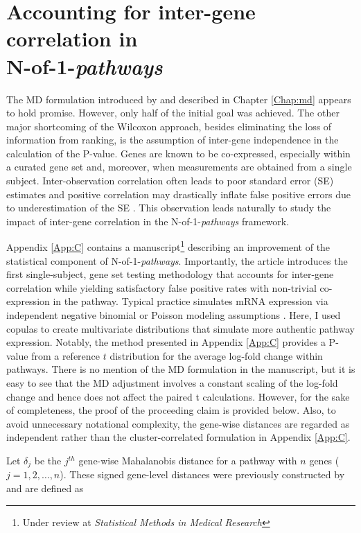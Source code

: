 \chapter{Accounting for inter-gene correlation in\\N-of-1-\emph{pathways}} \label{Chap:ct}

\indent \indent The MD formulation introduced by \citet{Schissler2015} and described in Chapter \ref{Chap:md} appears to hold promise. However, only half of the initial goal was achieved. The other major shortcoming of the Wilcoxon approach, besides eliminating the loss of information from ranking, is the assumption of inter-gene independence in the calculation of the P-value. Genes are known to be co-expressed, especially within a curated gene set \citep{Tamayo2016} and, moreover, when measurements are obtained from a single subject. Inter-observation correlation often leads to poor standard error (SE) estimates and positive correlation may drastically inflate false positive errors due to underestimation of the SE \citep{Wu2012}. This observation leads naturally to study the impact of inter-gene correlation in the N-of-1-\emph{pathways} framework.

Appendix \ref{App:C} contains a manuscript\footnote{Under review at \emph{Statistical Methods in Medical Research}} describing an improvement of the statistical component of N-of-1-\emph{pathways}. Importantly, the article introduces the first single-subject, gene set testing methodology that accounts for inter-gene correlation while yielding satisfactory false positive rates with non-trivial co-expression in the pathway. Typical practice simulates mRNA expression via independent negative binomial or Poisson modeling assumptions \citep{Gardeux2014}. Here, I used copulas \citep{Genest2007,Yan2007} to create multivariate distributions that simulate more authentic pathway expression. Notably, the method presented in Appendix \ref{App:C} provides a P-value from a reference $t$ distribution for the average log-fold change within pathways. There is no mention of the MD formulation in the manuscript, but it is easy to see that the MD adjustment involves a constant scaling of the log-fold change and hence does not affect the paired t calculations.  However, for the sake of completeness, the proof of the proceeding claim is provided below. Also, to avoid unnecessary notational complexity, the gene-wise distances are regarded as independent rather than the cluster-correlated formulation in Appendix \ref{App:C}.

Let $\delta_{j}$ be the $j^{th}$ gene-wise Mahalanobis distance for a pathway with $n$ genes ($j = 1,2,\ldots,n$). These signed gene-level distances were previously constructed by \citet{Schissler2015} and are defined as

